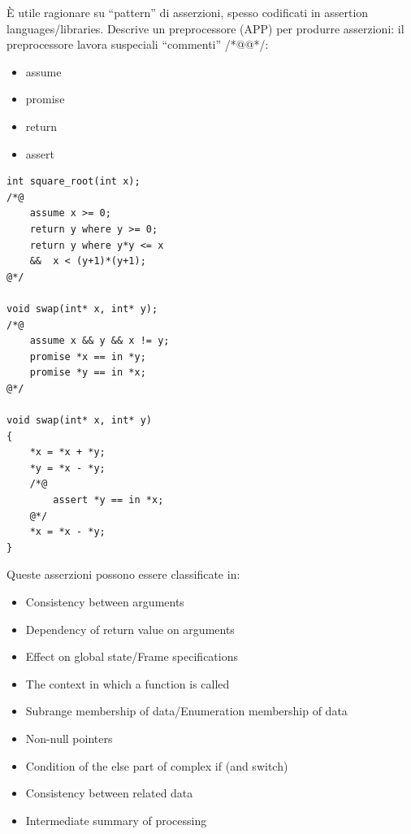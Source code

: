 \noindent È utile ragionare su “pattern” di asserzioni, spesso codificati in assertion languages/libraries.
Descrive un preprocessore (APP) per produrre asserzioni:  il preprocessore lavora suspeciali “commenti” /*@@*/:
\begin{itemize}
    \item assume
    \item promise
    \item return
    \item assert
\end{itemize}
\clearpage
\begin{verbatim}
int square_root(int x);
/*@ 
    assume x >= 0;
    return y where y >= 0;
    return y where y*y <= x 
    &&  x < (y+1)*(y+1); 
@*/

void swap(int* x, int* y);
/*@
    assume x && y && x != y;
    promise *x == in *y;
    promise *y == in *x;
@*/

void swap(int* x, int* y) 
{
    *x = *x + *y;
    *y = *x - *y;
    /*@ 
        assert *y == in *x; 
    @*/
    *x = *x - *y;
}
\end{verbatim} 

Queste asserzioni possono essere classificate in:
\begin{itemize}
    \item Consistency between arguments
    \item Dependency of return value on arguments
    \item Effect on global state/Frame specifications
    \item The context in which a function is called
    \item Subrange membership of data/Enumeration membership of data
    \item Non-null pointers
    \item Condition of the else part of complex if (and switch)
    \item Consistency between related data
    \item Intermediate summary of processing
\end{itemize}
